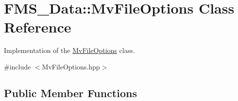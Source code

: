 \hypertarget{classFMS__Data_1_1MvFileOptions}{
\section{FMS\_\-Data::MvFileOptions Class Reference}
\label{classFMS__Data_1_1MvFileOptions}
}


Implementation of the \hyperlink{classFMS__Data_1_1MvFileOptions}{MvFileOptions} class.  




{\ttfamily \#include $<$MvFileOptions.hpp$>$}

\subsection*{Public Member Functions}
